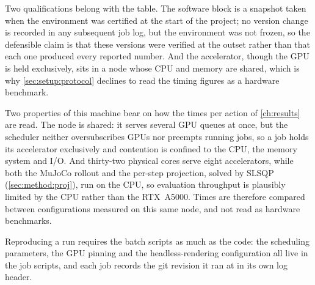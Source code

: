 Two qualifications belong with the table. The software block is a snapshot taken when the
environment was certified at the start of the project; no version change is recorded in any
subsequent job log, but the environment was not frozen, so the defensible claim is that these
versions were verified at the outset rather than that each one produced every reported number.
And the accelerator, though the GPU is held exclusively, sits in a node whose CPU and memory are
shared, which is why \autoref{sec:setup:protocol} declines to read the timing figures as a hardware
benchmark.

Two properties of this machine bear on how the times per action of \autoref{ch:results} are read. The
node is shared: it serves several GPU queues at once, but the scheduler neither oversubscribes GPUs nor
preempts running jobs, so a job holds its accelerator exclusively and contention is confined to the CPU,
the memory system and I/O. And thirty-two physical cores serve eight accelerators, while both the MuJoCo
rollout and the per-step projection, solved by SLSQP (\autoref{sec:method:proj}), run on the CPU, so
evaluation throughput is plausibly limited by the CPU rather than the RTX~A5000. Times are therefore
compared between configurations measured on this same node, and not read as hardware benchmarks.

Reproducing a run requires the batch scripts as much as the code: the scheduling parameters, the
GPU pinning and the headless-rendering configuration all live in the job scripts, and each job
records the git revision it ran at in its own log header.




